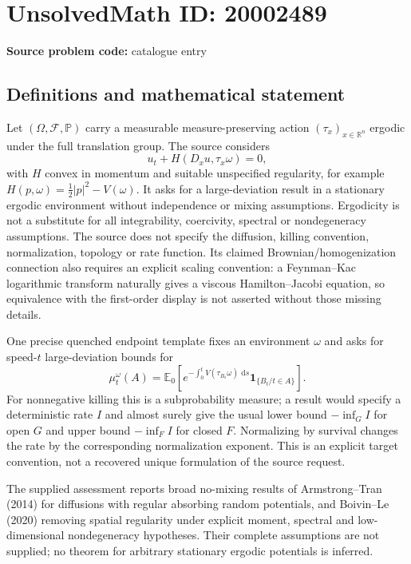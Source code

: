 \documentclass[11pt]{article}
\newcommand{\R}{\mathbb{R}}
\newcommand{\dd}{\,\mathrm{d}}
\begin{document}
\section*{UnsolvedMath ID: 20002489}
\textbf{Source problem code:} catalogue entry
\subsection{Definitions and mathematical statement}
Let $(\Omega,\mathcal F,\mathbb P)$ carry a measurable measure-preserving action $(\tau_x)_{x\in\R^n}$ ergodic under the full translation group. The source considers
\[
 u_t+H(D_xu,\tau_x\omega)=0,
\]
with $H$ convex in momentum and suitable unspecified regularity, for example $H(p,\omega)=\tfrac12|p|^2-V(\omega)$. It asks for a large-deviation result in a stationary ergodic environment without independence or mixing assumptions. Ergodicity is not a substitute for all integrability, coercivity, spectral or nondegeneracy assumptions. The source does not specify the diffusion, killing convention, normalization, topology or rate function. Its claimed Brownian/homogenization connection also requires an explicit scaling convention: a Feynman--Kac logarithmic transform naturally gives a viscous Hamilton--Jacobi equation, so equivalence with the first-order display is not asserted without those missing details.

One precise quenched endpoint template fixes an environment $\omega$ and asks for speed-$t$ large-deviation bounds for
\[
 \mu_t^\omega(A)=\mathbb E_0\left[
 e^{-\int_0^tV(\tau_{B_s}\omega)\,\dd s}
 \mathbf1_{\{B_t/t\in A\}}\right].
\]
For nonnegative killing this is a subprobability measure; a result would specify a deterministic rate $I$ and almost surely give the usual lower bound $-\inf_G I$ for open $G$ and upper bound $-\inf_F I$ for closed $F$. Normalizing by survival changes the rate by the corresponding normalization exponent. This is an explicit target convention, not a recovered unique formulation of the source request.

The supplied assessment reports broad no-mixing results of Armstrong--Tran (2014) for diffusions with regular absorbing random potentials, and Boivin--Le (2020) removing spatial regularity under explicit moment, spectral and low-dimensional nondegeneracy hypotheses. Their complete assumptions are not supplied; no theorem for arbitrary stationary ergodic potentials is inferred.
\end{document}
